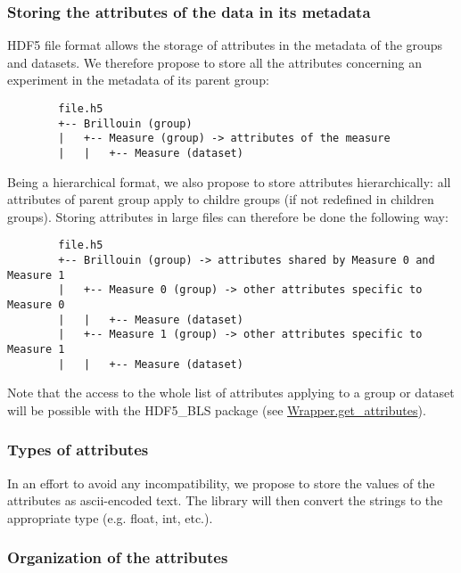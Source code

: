 \subsubsection*{Storing the attributes of the data in its metadata}

    HDF5 file format allows the storage of attributes in the metadata of the groups and datasets. We therefore propose to store all the attributes concerning an experiment in the metadata of its parent group:
    \begin{verbatim}
        file.h5
        +-- Brillouin (group)
        |   +-- Measure (group) -> attributes of the measure
        |   |   +-- Measure (dataset) 
    \end{verbatim}

    Being a hierarchical format, we also propose to store attributes hierarchically: all attributes of parent group apply to childre groups (if not redefined in children groups). Storing attributes in large files can therefore be done the following way:
    \begin{verbatim}
        file.h5
        +-- Brillouin (group) -> attributes shared by Measure 0 and Measure 1
        |   +-- Measure 0 (group) -> other attributes specific to Measure 0
        |   |   +-- Measure (dataset)
        |   +-- Measure 1 (group) -> other attributes specific to Measure 1
        |   |   +-- Measure (dataset)
    \end{verbatim}

    Note that the access to the whole list of attributes applying to a group or dataset will be possible with the HDF5\_BLS package (see \hyperref[subsec:wrapper.get_attributes]{Wrapper.get\_attributes}).

\subsubsection*{Types of attributes}

    In an effort to avoid any incompatibility, we propose to store the values of the attributes as ascii-encoded text. The library will then convert the strings to the appropriate type (e.g. float, int, etc.).

\subsubsection*{Organization of the attributes}

